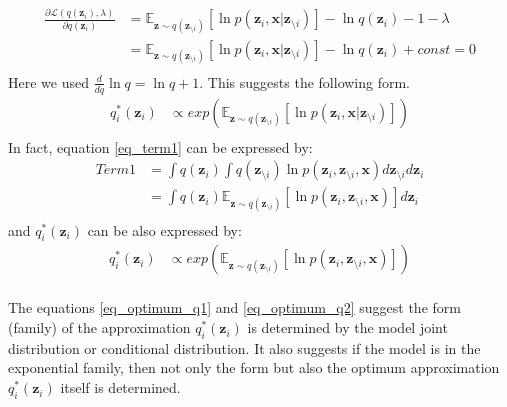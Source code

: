 \documentclass[a4]{article}
\begin{document}
\begin{equation}
\begin{aligned}
\frac{\partial\mathcal{L}( q(\mathbf{z}_i), \lambda )}{\partial q(\mathbf{z}_i)} &= \mathbb{E}_{\mathbf{z}\sim q(\mathbf{z}_{\setminus i})}[ \ln p(\mathbf{z}_i, \mathbf{x} | \mathbf{z}_{\setminus i}) ]
 - \ln q(\mathbf{z}_i) -1 - \lambda \\
&= \mathbb{E}_{\mathbf{z}\sim q(\mathbf{z}_{\setminus i})}[ \ln p(\mathbf{z}_i, \mathbf{x} | \mathbf{z}_{\setminus i}) ] - \ln q(\mathbf{z}_i) + const = 0\\
\end{aligned}
\end{equation}
Here we used $\frac{d}{dq}\ln q = \ln q + 1$.
This suggests the following form.
\begin{equation}
\begin{aligned}
q^*_i(\mathbf{z}_i) &\propto exp \left( \mathbb{E}_{\mathbf{z}\sim q(\mathbf{z}_{\setminus i})}[ \ln p(\mathbf{z}_i, \mathbf{x} | \mathbf{z}_{\setminus i}) ] \right)\label{eq_optimum_q1}\\
\end{aligned}
\end{equation}
In fact, equation \ref{eq_term1} can be expressed by:
\begin{equation}
\begin{aligned}
Term 1 &= \int q(\mathbf{z}_i) \int q(\mathbf{z}_{\setminus i}) \ln p(\mathbf{z}_i, \mathbf{z}_{\setminus i}, \mathbf{x})d\mathbf{z}_{\setminus i} d\mathbf{z}_i\\
       &= \int q(\mathbf{z}_i) \mathbb{E}_{\mathbf{z}\sim q(\mathbf{z}_{\setminus i})}[ \ln p(\mathbf{z}_i, \mathbf{z}_{\setminus i}, \mathbf{x}) ] d\mathbf{z}_i\label{eq_term1_2}\\
\end{aligned}
\end{equation}
and $q^*_i(\mathbf{z}_i)$ can be also expressed by:
\begin{equation}
\begin{aligned}
q^*_i(\mathbf{z}_i) &\propto exp \left( \mathbb{E}_{\mathbf{z}\sim q(\mathbf{z}_{\setminus i})}[ \ln p( \mathbf{z}_i, \mathbf{z}_{\setminus i}, \mathbf{x} ) ] \right)\label{eq_optimum_q2}\\
\end{aligned}
\end{equation}


The equations \ref{eq_optimum_q1} and  \ref{eq_optimum_q2} suggest the form (family) of the approximation $q^*_i(\mathbf{z}_i)$ is determined by the model joint distribution or conditional distribution.
It also suggests if the model is in the exponential family, then not only the form but also the optimum approximation $q^*_i(\mathbf{z}_i)$ itself is determined.


{}

\end{document}
